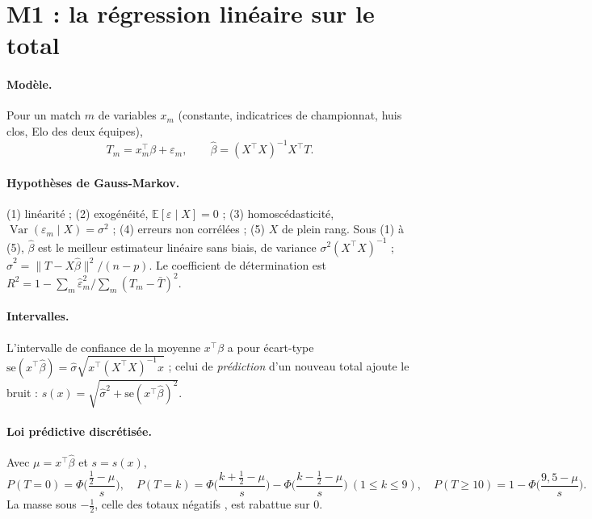 \section{M1 : la régression linéaire sur le total}
\label{sec:m1}

\paragraph{Modèle.} Pour un match \(m\) de variables \(x_m\) (constante, indicatrices de
championnat, huis clos, Elo des deux équipes),
\[
  T_m = x_m^\top \beta + \varepsilon_m,
  \qquad
  \hat\beta = (X^\top X)^{-1} X^\top T .
\]
\paragraph{Hypothèses de Gauss-Markov.} (1) linéarité ; (2) exogénéité, \(\mathbb{E}[\varepsilon
\mid X] = 0\) ; (3) homoscédasticité, \(\operatorname{Var}(\varepsilon_m \mid X) = \sigma^2\) ;
(4) erreurs non corrélées ; (5) \(X\) de plein rang. Sous (1) à (5), \(\hat\beta\) est le meilleur
estimateur linéaire sans biais, de variance \(\sigma^2 (X^\top X)^{-1}\) ; \(\hat\sigma^2 = \lVert T -
X\hat\beta\rVert^2 / (n - p)\). Le coefficient de détermination est \(R^2 = 1 - \sum_m \hat\varepsilon_m^2
/ \sum_m (T_m - \bar T)^2\).

\paragraph{Intervalles.} L'intervalle de confiance de la moyenne \(x^\top\beta\) a pour écart-type
\(\mathrm{se}(x^\top\hat\beta) = \hat\sigma \sqrt{x^\top (X^\top X)^{-1} x}\) ; celui de
\emph{prédiction} d'un nouveau total ajoute le bruit :
\(s(x) = \sqrt{\hat\sigma^2 + \mathrm{se}(x^\top\hat\beta)^2}\).

\paragraph{Loi prédictive discrétisée.} Avec \(\mu = x^\top\hat\beta\) et \(s = s(x)\),
\[
  P(T = 0) = \Phi\!\Big(\frac{\tfrac12 - \mu}{s}\Big),\quad
  P(T = k) = \Phi\!\Big(\frac{k + \tfrac12 - \mu}{s}\Big) - \Phi\!\Big(\frac{k - \tfrac12 - \mu}{s}\Big)\ (1 \le k \le 9),\quad
  P(T \ge 10) = 1 - \Phi\!\Big(\frac{9{,}5 - \mu}{s}\Big).
\]
La masse sous \(-\tfrac12\), celle des totaux \og négatifs \fg{}, est rabattue sur 0.

